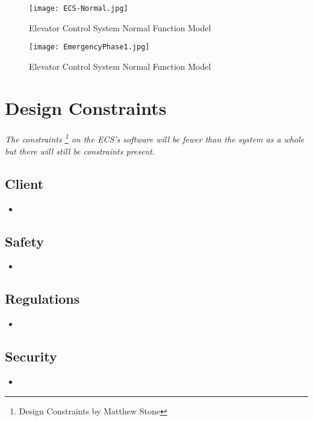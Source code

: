 \documentclass[12pt]{article}
\begin{document}
		\begin{figure}[H]
  			\centerline{\texttt{[image: ECS-Normal.jpg]}}
  			\caption{Elevator Control System Normal Function Model }
  			\label{fig:normal}
		\end{figure}
	
		\begin{figure}[H]
  			\centerline{\texttt{[image: EmergencyPhase1.jpg]}}
  			\caption{Elevator Control System Normal Function Model }
  			\label{fig:emerg}
		\end{figure}

\section{Design Constraints} \label{cons} %
	\paragraph{} \textit{The constraints \footnote{Design Constraints by Matthew Stone} on the ECS’s software will be fewer than the system 
	as a whole but there will still be constraints present.}

	\subsection{Client}
	\begin{itemize}
		\item 
	\end{itemize}

	\subsection{Safety}
	\begin{itemize}
		\item 
	\end{itemize}

	\subsection{Regulations}
	\begin{itemize}
		\item 
	\end{itemize}

	\subsection{Security}
	\begin{itemize}
		\item 
	\end{itemize}
\end{document}
